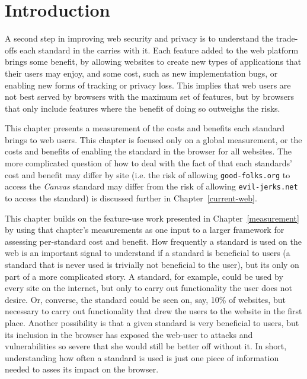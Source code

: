 \section{Introduction}
\label{cost-benefit:introduction}

A second step in improving web security and privacy is to understand the
trade-offs each standard in the \WAPI carries with it.
Each feature added to the web platform brings some benefit,
by allowing websites to create new types of applications that their users
may enjoy, and some cost, such as new implementation bugs, or enabling new forms
of tracking or privacy loss.  This implies that web users are not best served
by browsers with the maximum set of features, but by browsers that only include
features where the benefit of doing so outweighs the risks.

This chapter presents a measurement of the costs and benefits each standard
brings to web users.  This chapter is focused only on a global measurement,
or the costs and benefits of enabling the standard in the browser for all
websites.  The more complicated question of how to deal with the fact of that
each standards' cost and benefit may differ by site (i.e. the risk of allowing
\texttt{good-folks.org} to access the \textit{Canvas} standard may differ
from the risk of allowing \texttt{evil-jerks.net} to access the standard)
is discussed further in Chapter~\ref{current-web}.

This chapter builds on the feature-use work presented in Chapter~\ref{measurement}
by using that chapter's \WAPI measurements as one input to a
larger framework for assessing per-standard cost and benefit.  How frequently
a standard is used on the web is an important signal to understand if a standard
is beneficial to users (a \WAPI standard that is never used is trivially not
beneficial to the user), but its only on part of a more complicated story.
A standard, for example, could be used by every site on the internet, but only
to carry out functionality the user does not desire. Or, converse, the standard
could be seen on, say, 10\% of websites, but necessary to carry out functionality
that drew the users to the website in the first place.  Another possibility
is that a given standard is very beneficial to users, but its inclusion
in the browser has exposed the web-user to attacks and vulnerabilities so
severe that she would still be better off without it.  In short,
understanding how often a \WAPI standard is used is just one piece of
information needed to asses its impact on the browser.

